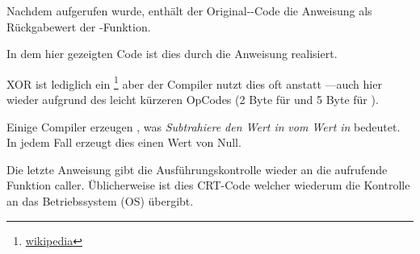 Nachdem \printf aufgerufen wurde, enthält der Original-\CCpp-Code die Anweisung  als Rückgabewert der \main-Funktion.

In dem hier gezeigten Code ist dies durch die Anweisung  realisiert.


XOR ist lediglich ein \footnote{\href{http://go.yurichev.com/17118}{wikipedia}} aber der Compiler nutzt dies oft anstatt
---auch hier wieder aufgrund des leicht kürzeren OpCodes (2 Byte für \XOR und 5 Byte für \MOV).

Einige Compiler erzeugen , was \emph{Subtrahiere den Wert in} \EAX \emph{vom Wert in} \EAX bedeutet.
In jedem Fall erzeugt dies einen Wert von Null.

Die letzte Anweisung \RET gibt die Ausführungskontrolle wieder an die aufrufende Funktion \gls{caller}.
Üblicherweise ist dies \CCpp \ac{CRT}-Code welcher wiederum die Kontrolle an das Betriebssystem (\ac{OS}) übergibt.
